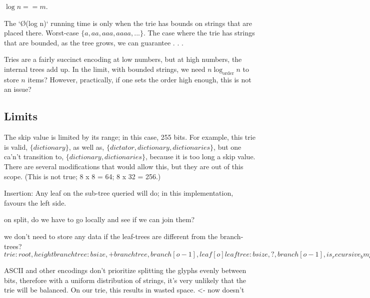 \documentclass[12pt]{article}
\begin{document}
\cite{shannon1948mathematical} $\log n == m$.

The `\O(log n)` running time is only when the trie has bounds on strings that are placed there. Worst-case $\{ a, aa, aaa, aaaa, ... \}$. The case where the trie has strings that are bounded, as the tree grows, we can guarantee . . .

Tries are a fairly succinct encoding at low numbers, but at high numbers, the internal trees add up. In the limit, with bounded strings, we need $n \log_{\text{order}} n$ to store $n$ items? However, practically, if one sets the order high enough, this is not an issue?

\subsection{Limits}

The skip value is limited by its range; in this case, 255 bits. For example, this trie is valid, $\{ dictionary \}$, as well as, $\{ dictator, dictionary, dictionaries \}$, but one ca'n't transition to, $\{ dictionary, dictionaries \}$, because it is too long a skip value. There are several modifications that would allow this, but they are out of this scope. (This is not true; 8 x 8 = 64; 8 x 32 = 256.)

Insertion: Any leaf on the sub-tree queried will do; in this implementation, favours the left side.

on split, do we have to go locally and see if we can join them?

we don't need to store any data if the leaf-trees are different from the branch-trees?
$
trie: root, height
branch tree: bsize, +branchtree, branch[o-1], leaf[o]
leaf tree: bsize, ?, branch[o-1], is_recursive_bmp[o/8], leaf[o]
or
leaf tree: bsize, ?, branch[o-1], leaf[o] { skip, union{ data, trie } }
or
leaf tree: bsize, ?, branch[o-1], leaf[o] { 32:skip, 32:height, 64:root / 64:data }
$

ASCII and other encodings don't prioritize splitting the glyphs evenly between bits, therefore with a uniform distribution of strings, it's very unlikely that the trie will be balanced. On our trie, this results in wasted space. <- now doesn't


\end{document}
